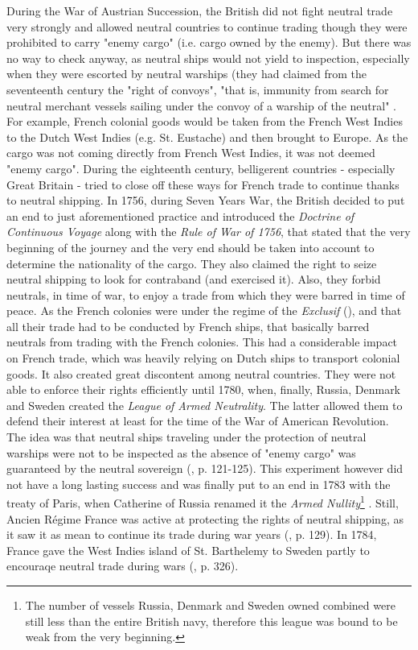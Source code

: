 \documentclass[12pt,a4paper,notitlepage,english]{article}
\begin{document}
During the War of Austrian Succession, the British did not fight neutral trade very strongly and allowed neutral countries to continue trading though they were prohibited to carry "enemy cargo" (i.e. cargo owned by the enemy). But there was no way to check anyway, as neutral ships would not yield to inspection, especially when they were escorted by neutral warships (they had claimed from the seventeenth century the "right of convoys", "that is, immunity from search for neutral merchant vessels sailing under the convoy of a warship of the neutral"  \citep{TheEditorsofEncyclopaediaBritannica2014} .
For example, French colonial goods would be taken from the French West Indies to the Dutch West Indies (e.g. St. Eustache) and then brought to Europe.
As the cargo was not coming directly from French West Indies, it was not deemed "enemy cargo". 
During the eighteenth century, belligerent countries - especially Great Britain - tried to  close off these ways for French trade to continue thanks to neutral shipping.
In 1756, during Seven Years War, the British decided to put an end to just aforementioned practice and introduced the \textit{Doctrine of Continuous Voyage} along with the \textit{Rule of War of 1756}, that stated that the very beginning of the journey and the very end should be taken into account to determine the nationality of the cargo.
They also claimed the right to seize neutral shipping to look for contraband (and exercised it).
Also, they forbid neutrals, in time of war, to enjoy a trade from which they were barred in time of peace. As the French colonies were under the regime of the \textit{Exclusif} (\cite{Tarrade1972}), and that all their trade had to be conducted by French ships, that basically barred neutrals from trading with the French colonies.
This had a considerable impact on French trade, which was heavily relying on Dutch ships to transport colonial goods.
It also created great discontent among neutral countries. They were not able to enforce their rights efficiently until 1780, when, finally, Russia, Denmark and Sweden created the \textit{League of Armed Neutrality}.
The latter allowed them to defend their interest at least for the time of the War of American Revolution.
The idea was that neutral ships traveling under the protection of neutral warships were not to be inspected as the absence of "enemy cargo" was guaranteed by the neutral sovereign (\cite{Schnakenbourg2013}, p. 121-125).
This experiment however did not have a long lasting success and was finally put to an end in 1783 with the treaty of Paris, when Catherine of Russia renamed it the \textit{Armed Nullity}\footnote{The number of vessels Russia, Denmark and Sweden owned combined were still less than the entire British navy, therefore this league was bound to be weak from the very beginning.} \citep{Griffiths1971}.
Still, Ancien Régime France was active at protecting the rights of neutral shipping, as it saw it as mean to continue its trade during war years (\cite{Schnakenbourg2013}, p. 129).
In 1784, France gave the West Indies island of St. Barthelemy to Sweden partly to encouraqe neutral trade during wars (\cite{Schnakenbourg2013}, p. 326).
\end{document}
